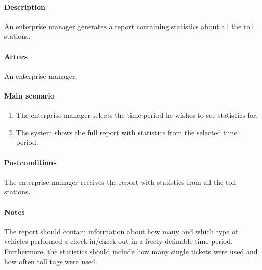 \paragraph{Description}
An enterprise manager generates a report containing statistics about all the toll stations.
\paragraph{Actors}
An enterprise manager.
\paragraph{Main scenario}
\begin{enumerate}
\item The enterprise manager selects the time period he wishes to see statistics for.
\item The system shows the full report with statistics from the selected time period.
\end{enumerate}
\paragraph{Postconditions}
The enterprise manager receives the report with statistics from all the toll stations.
\paragraph{Notes}
The report should contain information about how many and which type of vehicles performed a check-in/check-out in a freely definable time period. Furthermore, the statistics should include how many single tickets were
used and how often toll tags were used.
